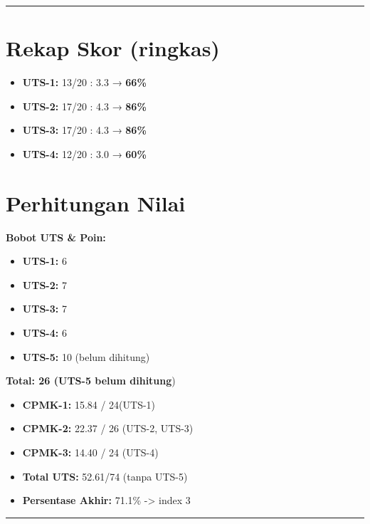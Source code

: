 \documentclass[
  letterpaper,
  DIV=11,
  numbers=noendperiod]{scrreprt}
\providecommand{\tightlist}{%
  \setlength{\itemsep}{0pt}\setlength{\parskip}{0pt}}
\begin{document}
\begin{center}\rule{0.5\linewidth}{0.5pt}\end{center}

\section{Rekap Skor (ringkas)}\label{rekap-skor-ringkas}

\begin{itemize}
\tightlist
\item
  \textbf{UTS-1:} 13/20 : 3.3 → \textbf{66\%}
\item
  \textbf{UTS-2:} 17/20 : 4.3 → \textbf{86\%}
\item
  \textbf{UTS-3:} 17/20 : 4.3 → \textbf{86\%}
\item
  \textbf{UTS-4:} 12/20 : 3.0 → \textbf{60\%}
\end{itemize}

\section{Perhitungan Nilai}\label{perhitungan-nilai}

\textbf{Bobot UTS \& Poin:}

\begin{itemize}
\item
  \textbf{UTS-1:} 6
\item
  \textbf{UTS-2:} 7
\item
  \textbf{UTS-3:} 7
\item
  \textbf{UTS-4:} 6
\item
  \textbf{UTS-5:} 10 (belum dihitung)
\end{itemize}

\textbf{Total: 26 (UTS-5 belum dihitung})

\begin{itemize}
\item
  \textbf{CPMK-1:} 15.84 / 24(UTS-1)
\item
  \textbf{CPMK-2:} 22.37 / 26 (UTS-2, UTS-3)
\item
  \textbf{CPMK-3:} 14.40 / 24 (UTS-4)
\item
  \textbf{Total UTS:} 52.61/74 (tanpa UTS-5)
\item
  \textbf{Persentase Akhir:} 71.1\% -\textgreater{} index 3
\end{itemize}

\begin{center}\rule{0.5\linewidth}{0.5pt}\end{center}
\end{document}
